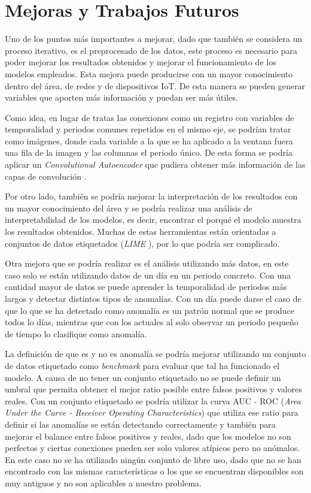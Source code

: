 \chapter{Mejoras y Trabajos Futuros}
\label{chapter:Mejoras}

Uno de los puntos más importantes a mejorar, dado que también se considera un proceso iterativo, es el preprocesado de los datos, este proceso es necesario para poder mejorar los resultados obtenidos y mejorar el funcionamiento de los modelos empleados. Esta mejora puede producirse con un mayor conocimiento dentro del área, de redes y de dispositivos IoT. De esta manera se pueden generar variables que aporten más información y puedan ser más útiles.

Como idea, en lugar de tratas las conexiones como un registro con variables de temporalidad y periodos comunes  repetidos en el mismo eje, se podrían tratar como imágenes, donde cada variable a la que se ha aplicado a la ventana fuera una fila de la imagen y las columnas el periodo único. De esta forma se podría aplicar un \textit{Convolutional Autoencoder} que pudiera obtener más información de las capas de convolución \cite{bankex}.

Por otro lado, también se podría mejorar la interpretación de los resultados con un mayor conocimiento del área y se podría realizar una análisis de interpretabilidad de los modelos, es decir, encontrar el porqué el modelo muestra los resultados obtenidos. Muchas de estas herramientas están orientadas a conjuntos de datos etiquetados (\textit{LIME} \cite{DBLP:journals/corr/RibeiroSG16}), por lo que podría ser complicado.

Otra mejora que se podría realizar es el análisis utilizando más datos, en este caso solo se están utilizando datos de un día en un periodo concreto. Con una cantidad mayor de datos se puede aprender la temporalidad de periodos más largos y detectar distintos tipos de anomalías. Con un día puede darse el caso de que lo que se ha detectado como anomalía es un patrón normal que se produce todos lo días, mientras que con los actuales al solo observar un periodo pequeño de tiempo lo clasifique como anomalía. 

La definición de que es y no es anomalía se podría mejorar utilizando un conjunto de datos etiquetado como \textit{benchmark} para evaluar que tal ha funcionado el modelo. A causa de no tener un conjunto etiquetado no se puede definir un umbral que permita obtener el mejor ratio posible entre falsos positivos y valores reales. Con un conjunto etiquetado se podría utilizar la curva AUC - ROC (\textit{Area Under the Curve - Receiver Operating Characteristics}) que utiliza ese ratio para definir si las anomalías se están detectando correctamente y también para mejorar el balance entre falsos positivos y reales, dado que los modelos no son perfectos y ciertas conexiones pueden ser solo valores atípicos pero no anómalos. En este caso no se ha utilizado ningún conjunto de libre uso, dado que no se han encontrado con las mismas características o los que se encuentran disponibles son muy antiguos y no son aplicables a nuestro problema.

